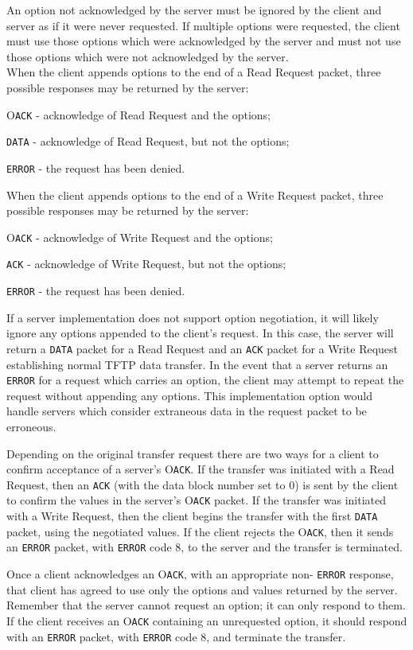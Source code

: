 \documentclass[12pt]{article}
\begin{document}
An option not acknowledged by the server must be ignored by the
client and server as if it were never requested. If multiple options
were requested, the client must use those options which were
acknowledged by the server and must not use those options which were
not acknowledged by the server.\\

When the client appends options to the end of a Read Request packet,
three possible responses may be returned by the server:

   O\verb|ACK| - acknowledge of Read Request and the options;

   \verb|DATA| - acknowledge of Read Request, but not the options;

    \verb|ERROR| - the request has been denied.

When the client appends options to the end of a Write Request packet,
three possible responses may be returned by the server:

   O\verb|ACK| - acknowledge of Write Request and the options;

   \verb|ACK|  - acknowledge of Write Request, but not the options;

    \verb|ERROR| - the request has been denied.

If a server implementation does not support option negotiation, it
will likely ignore any options appended to the client's request. In
this case, the server will return a \verb|DATA| packet for a Read Request
and an \verb|ACK| packet for a Write Request establishing normal TFTP data
transfer. In the event that a server returns an  \verb|ERROR| for a request
which carries an option, the client may attempt to repeat the request
without appending any options. This implementation option would
handle servers which consider extraneous data in the request packet
to be erroneous.

Depending on the original transfer request there are two ways for a
client to confirm acceptance of a server's O\verb|ACK|. If the transfer was
initiated with a Read Request, then an \verb|ACK| (with the data block
number set to 0) is sent by the client to confirm the values in the
server's O\verb|ACK| packet. If the transfer was initiated with a Write
Request, then the client begins the transfer with the first \verb|DATA|
packet, using the negotiated values. If the client rejects the O\verb|ACK|,
then it sends an  \verb|ERROR| packet, with  \verb|ERROR| code 8, to the server and
the transfer is terminated.

Once a client acknowledges an O\verb|ACK|, with an appropriate non- \verb|ERROR|
response, that client has agreed to use only the options and values
returned by the server. Remember that the server cannot request an
option; it can only respond to them. If the client receives an O\verb|ACK|
containing an unrequested option, it should respond with an  \verb|ERROR|
packet, with  \verb|ERROR| code 8, and terminate the transfer.
\end{document}
